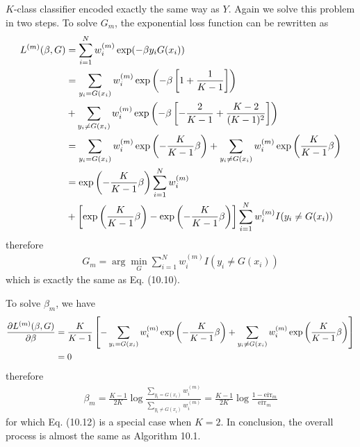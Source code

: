\begin{exercise}
\begin{exerciseSection}
    $K$-class classifier encoded exactly the same way as $Y$.
    Again we solve this problem in two steps. To solve $G_m$, the exponential
    loss function can be rewritten as
    \begin{align}
      L^{(m)}(\beta, G) &= \sum_{i=1}^Nw_i^{(m)} \exp(-\beta
      y_iG(x_i)) \notag\\
      &= \sum_{y_i=G(x_i)}w_i^{(m)}\exp\left(-\beta\left[1 +
      \frac{1}{K-1}\right]\right) \notag\\ 
      &+
      \sum_{y_i\not=G(x_i)} w_i^{(m)}\exp\left(-\beta\left[-\frac{2}{K-1} +
      \frac{K-2}{(K-1)^2}\right]\right) \notag\\
      &= \sum_{y_i=G(x_i)}w_i^{(m)}\exp\left(-
      \frac{K}{K-1}\beta\right) +
      \sum_{y_i\not=G(x_i)} w_i^{(m)}\exp\left(\frac{K}{K-1}\beta\right)
      \notag\\
      &= \exp\left(-\frac{K}{K-1}\beta\right)\sum_{i=1}^Nw_i^{(m)} \notag\\
      &+ \left[\exp\left(\frac{K}{K-1}\beta\right) -
      \exp\left(-\frac{K}{K-1}\beta\right) \right]\sum_{i=1}^N w_i^{(m)}I(y_i\not=G(x_i))
    \end{align}
    therefore
    \begin{align}
      G_m = \arg\min_{G} \sum_{i=1}^Nw_i^{(m)} I(y_i\not=G(x_i))
    \end{align}
    which is exactly the same as Eq. (10.10).
    
    To solve $\beta_m$, we have
    \begin{align}
      \pdv{L^{(m)}(\beta, G)}{\beta} &=
      \frac{K}{K-1}\left[-\sum_{y_i=G(x_i)}w_i^{(m)}\exp\left(-\frac{K}{K-1}\beta\right)
      + \sum_{y_i\not=G(x_i)} w_i^{(m)}\exp\left(\frac{K}{K-1}\beta\right)\right] \notag\\
      &= 0
    \end{align}
    therefore
    \begin{align}
      \beta_m = \frac{K-1}{2K}\log\frac{\sum_{y_i=G(x_i)}w_i^{(m)}}
      {\sum_{y_i\not=G(x_i)}w_i^{(m)}} = \frac{K-1}{2K}
      \log\frac{1-\overline{\mbox{err}}_m} {\overline{\mbox{err}}_m}
    \end{align}
    for which Eq. (10.12) is a special case when $K=2$. In conclusion, the
    overall process is almost the same as Algorithm 10.1.
  \end{exerciseSection}
\end{exercise}

\begin{exercise}[(Program)]
\end{exercise}

